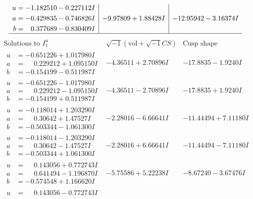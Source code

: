\documentclass[1p]{elsarticle_modified}
\theoremstyle{definition}
\newcommand{\I}{\sqrt{-1}}
\begin{document}
$$\begin{array}{c|c|c}
\begin{aligned}
u &= -1.182510 - 0.227112 I \\
a &= -0.429835 - 0.746826 I \\
b &= \phantom{-}0.377689 - 0.830409 I\end{aligned}
 & -9.97809 + 1.88428 I & -12.95942 - 3.16374 I\\
 \hline 
 \end{array}$$\newpage$$\begin{array}{c|c|c}  
\text{Solutions to }I^u_{1}& \I (\text{vol} + \sqrt{-1}CS) & \text{Cusp shape}\\
 \hline 
\begin{aligned}
u &= -0.651226 + 1.017980 I \\
a &= \phantom{-}0.229212 + 1.095150 I \\
b &= -0.154199 - 0.511987 I\end{aligned}
 & -4.36511 + 2.70896 I & -17.8835 - 1.9240 I \\ \hline\begin{aligned}
u &= -0.651226 - 1.017980 I \\
a &= \phantom{-}0.229212 - 1.095150 I \\
b &= -0.154199 + 0.511987 I\end{aligned}
 & -4.36511 - 2.70896 I & -17.8835 + 1.9240 I \\ \hline\begin{aligned}
u &= -0.118014 + 1.203290 I \\
a &= \phantom{-}0.30642 + 1.47527 I \\
b &= -0.503344 - 1.061300 I\end{aligned}
 & -2.28016 - 6.66641 I & -11.44494 + 7.11180 I \\ \hline\begin{aligned}
u &= -0.118014 - 1.203290 I \\
a &= \phantom{-}0.30642 - 1.47527 I \\
b &= -0.503344 + 1.061300 I\end{aligned}
 & -2.28016 + 6.66641 I & -11.44494 - 7.11180 I \\ \hline\begin{aligned}
u &= \phantom{-}0.143056 + 0.772743 I \\
a &= \phantom{-}0.641494 - 1.196870 I \\
b &= -0.574548 + 1.166620 I\end{aligned}
 & -5.75586 + 5.22238 I & -8.67240 - 3.67476 I \\ \hline\begin{aligned}
u &= \phantom{-}0.143056 - 0.772743 I \\

\end{aligned}
\end{array}$$
\end{document}
